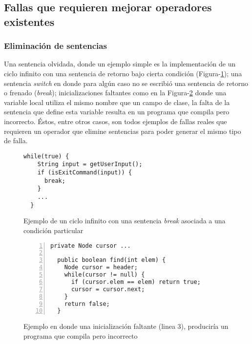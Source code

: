 \subsection{Fallas que requieren mejorar operadores existentes}

\subsubsection{Eliminaci\'on de sentencias}

Una sentencia olvidada, donde un ejemplo simple es la implementaci\'on de un ciclo infinito con una sentencia de retorno bajo cierta condici\'on (Figura-\ref{figures.examples.infCicle}); una sentencia \emph{switch} en donde para alg\'un caso no se escribi\'o una sentencia de retorno o frenado (\emph{break}); inicializaciones faltantes como en la Figura-\ref{figures.examples.localVariableHidingField} donde una variable local utiliza el mismo nombre que un campo de clase, la falta de la sentencia que define esta variable resulta en un programa que compila pero incorrecto. \'Estos, entre otros casos, son todos ejemplos de fallas reales que requieren un operador que elimine sentencias para poder generar el mismo tipo de falla.

\begin{figure}
	\begin{lstlisting}[frame=single, mathescape=true,framexleftmargin=1.5em]
  while(true) {
    String input = getUserInput();
    if (isExitCommand(input)) {
      break;
    }
    ...
  }
	\end{lstlisting}
	\caption{Ejemplo de un ciclo infinito con una sentencia \emph{break} asociada a una condici\'on particular}
	\label{figures.examples.infCicle}
\end{figure}

\begin{figure}
	\begin{lstlisting}[frame=single, numbers=left, mathescape=true,framexleftmargin=1.5em]
  private Node cursor ...
	
  public boolean find(int elem) {
    Node cursor = header;
    while(cursor != null) {
      if (cursor.elem == elem) return true;
      cursor = cursor.next;
    }
    return false;
  }
	\end{lstlisting}
	\caption{Ejemplo en donde una inicializaci\'on faltante (linea 3), producir\'ia un programa que compila pero incorrecto}
	\label{figures.examples.localVariableHidingField}
\end{figure}

